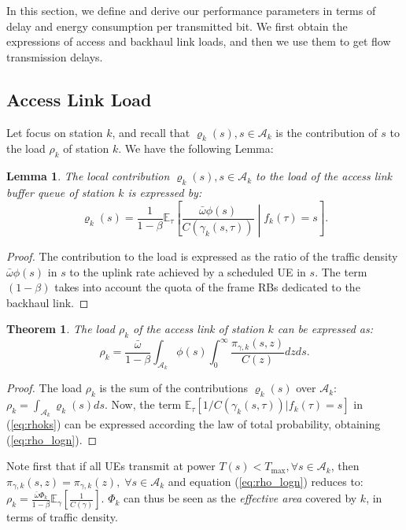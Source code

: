 \documentclass[draftcls,onecolumn]{IEEEtran}
\theoremstyle{plain}
\newtheorem{lemma}{Lemma}
\newtheorem{theorem}{Theorem}
\theoremstyle{definition}
\begin{document}
In this section, we define and derive our performance parameters in terms of delay and energy consumption per transmitted bit. We first obtain the expressions of access and backhaul link loads, and then we use them to get flow transmission delays. 

\subsection{Access Link Load} \label{subsec:accessload}


Let focus on station $k$, and recall that $\varrho_k(s), s \in \mathcal{A}_k$ is the contribution of $s$ to the load $\rho_k$ of station $k$. 
We have the following Lemma:
\begin{lemma}
The local contribution $\varrho_k(s),s \in \mathcal{A}_k$ to the load of the access link buffer queue of station $k$ is expressed by:
\begin{equation} \label{eq:rhoks}
 \varrho_k(s)=\frac{1}{1-\beta}\mathbb{E}_{\tau}\left[ \frac{\bar{\omega}\phi(s)}{C(\gamma_k(s,\tau))} \middle| f_k(\tau)=s \right].
\end{equation}
\end{lemma} 
\begin{proof}
The contribution to the load is expressed as the ratio of the traffic density $\bar{\omega}\phi(s)$ in $s$ to the uplink rate achieved by a scheduled UE in $s$. The term $(1-\beta)$ takes into account the quota of the frame RBs dedicated to the backhaul link.  
\end{proof}

\begin{theorem} \label{th:rho}
The load $\rho_k$ of the access link of station $k$ can be expressed as:
\begin{equation}\label{eq:rho_logn}
    \rho_k=\frac{\bar{\omega}}{1-\beta}  \int_{\mathcal{A}_k} \phi(s)  \int_{0}^{\infty}\frac{\pi_{\gamma,k}(s,z)}{C(z)}{dz}{ds}.
\end{equation}
\end{theorem}
\begin{proof}
The load $\rho_k$ is the sum of the contributions $\varrho_k(s)$ over $\mathcal{A}_k$: 
$\rho_k= \int_{\mathcal{A}_k} \varrho_k(s){ds}$. Now, the term $\mathbb{E}_{\tau}[ 1/C(\gamma_k(s,\tau))  | f_k(\tau)=s ]$ in (\ref{eq:rhoks}) can be expressed according the law of total probability, obtaining (\ref{eq:rho_logn}).
\end{proof}

Note first that if all UEs transmit at power $T(s)<T_{\max}, \forall s \in \mathcal{A}_k$, then $\pi_{\gamma,k}(s,z)=\pi_{\gamma,k}(z), \;\forall s \in \mathcal{A}_k$ and equation (\ref{eq:rho_logn}) reduces to: $\rho_k=\frac{\bar{\omega}\Phi_k}{1-\beta} \mathbb{E}_{\gamma}\left[\frac{1}{C(\gamma)}\right]$. $\Phi_k$ can thus be seen as the {\it effective area} covered by $k$, in terms of traffic density.
\end{document}
